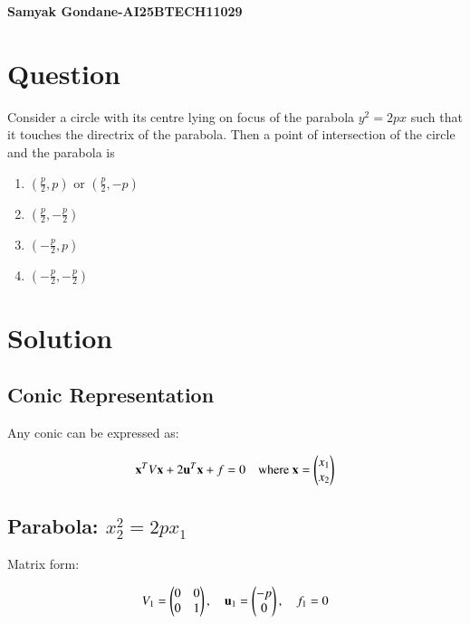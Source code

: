 \documentclass{article}
\begin{document}
\begin{center}
\large
    \textbf{Samyak Gondane-AI25BTECH11029}
\end{center}
\date{}

\section*{Question}
Consider a circle with its centre lying on focus of the parabola $y^2 = 2px$ such that it touches the directrix of the parabola. Then a point of intersection of the circle and the parabola is

\begin{multicols}{2}
\begin{enumerate}
    \item $(\frac{p}{2}, p)$ or $(\frac{p}{2}, -p)$
    \item $(\frac{p}{2}, -\frac{p}{2})$
    \item $(-\frac{p}{2}, p)$
    \item $(-\frac{p}{2}, -\frac{p}{2})$
\end{enumerate}
\end{multicols}

\section*{Solution}

\subsection*{Conic Representation}

Any conic can be expressed as:


\begin{align}
\mathbf{x}^T V \mathbf{x} + 2 \mathbf{u}^T \mathbf{x} + f = 0
\quad \text{where } \mathbf{x} = \begin{pmatrix}x_1 \\ x_2\end{pmatrix}
\end{align}



\subsection*{Parabola: $x_2^2 = 2p x_1$}

Matrix form:


\begin{align}
V_1 = \begin{pmatrix}0 & 0 \\ 0 & 1\end{pmatrix}, \quad
\mathbf{u}_1 = \begin{pmatrix}-p \\ 0\end{pmatrix}, \quad
f_1 = 0
\end{align}
\end{document}
